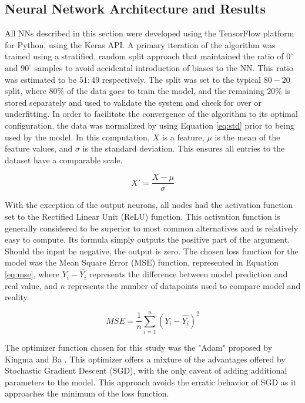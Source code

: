 \documentclass[main.tex]{subfiles}
\begin{document}
\subsection{Neural Network Architecture and Results}\label{ssec:MLA}

All NNs described in this section were developed using the TensorFlow platform for Python, using the Keras API. A primary iteration of the algorithm was trained using a stratified, random split approach that maintained the ratio of $0^{\circ}$ and $90^{\circ}$ samples to avoid accidental introduction of biases to the NN. This ratio was estimated to be  $51:49$ respectively. The split was set to the typical $80-20$ split, where $80\%$ of the data goes to train the model, and the remaining $20\%$ is stored separately and used to validate the system and check for over or underfitting. In order to facilitate the convergence of the algorithm to its optimal configuration, the data was normalized by using Equation \ref{eq:std} prior to being used by the model. In this computation, $X$ is a feature, $\mu$ is the mean of the feature values, and $\sigma$ is the standard deviation. This ensures all entries to the dataset have a comparable scale.

\begin{equation} \label{eq:std}
	X' = \frac{X-\mu}{\sigma}
\end{equation} 

With the exception of the output neurons, all nodes had the activation function set to the Rectified Linear Unit (ReLU) function. This activation function is generally considered to be superior to most common alternatives and is relatively easy to compute. Its formula simply outputs the positive part of the argument. Should the input be negative, the output is zero. The chosen loss function for the model was the Mean Square Error (MSE) function, represented in Equation \ref{eq:mse}, where $Y_{i}-\hat{Y_{i}}$ represents the difference between model prediction and real value, and $n$ represents the number of datapoints used to compare model and reality. 

\begin{equation} \label{eq:mse}
	MSE = \frac{1}{n}\sum_{i=1}^{n} (Y_{i}-\hat{Y_{i}})^2
\end{equation}

The optimizer function chosen for this study was the "Adam" proposed by Kingma and Ba \cite{kingma2017adam}. This optimizer offers a mixture of the advantages offered by Stochastic Gradient Descent (SGD), with the only caveat of adding additional parameters to the model. This approach avoids the erratic behavior of SGD as it approaches the minimum of the loss function.
\end{document}
